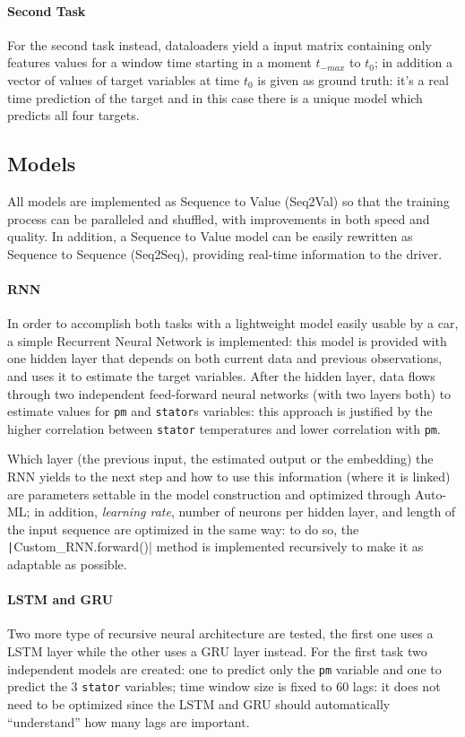 \paragraph{Second Task}
For the second task instead, dataloaders yield a input matrix containing only features values for a window time starting in a moment $t_{-max}$ to $t_0$; in addition a vector of values of target variables at time $t_0$ is given as ground truth: it's a real time prediction of the target and in this case there is a unique model which predicts all four targets.

\subsection{Models}
All models are implemented as Sequence to Value (Seq2Val) so that the training process can be paralleled and shuffled, with improvements in both speed and quality.
In addition, a Sequence to Value model can be easily rewritten as Sequence to Sequence (Seq2Seq), providing real-time information to the driver.

\paragraph{RNN}
In order to accomplish both tasks with a lightweight model easily usable by a car, a simple Recurrent Neural Network is implemented: this model is provided with one hidden layer that depends on both current data and previous observations, and uses it to estimate the target variables.
After the hidden layer, data flows through two independent feed-forward neural networks (with two layers both) to estimate values for \verb|pm| and \verb|stator|s variables: this approach is justified by the higher correlation between \verb|stator| temperatures and lower correlation with \verb|pm|.

Which layer (the previous input, the estimated output or the embedding) the RNN yields to the next step and how to use this information (where it is linked) are parameters settable in the model construction and optimized through Auto-ML; in addition, \textit{learning rate}, number of neurons per hidden layer, and length of the input sequence are optimized in the same way: to do so, the \texttt|Custom_RNN.forward()| method is implemented recursively to make it as adaptable as possible.

\paragraph{LSTM and GRU}
Two more type of recursive neural architecture are tested, the first one uses a LSTM layer while the other uses a GRU layer instead.
For the first task two independent models are created: one to predict only the \verb|pm| variable and one to predict the 3 \verb|stator| variables; time window size is fixed to 60 lags: it does not need to be optimized since the LSTM and GRU should automatically ``understand'' how many lags are important.

